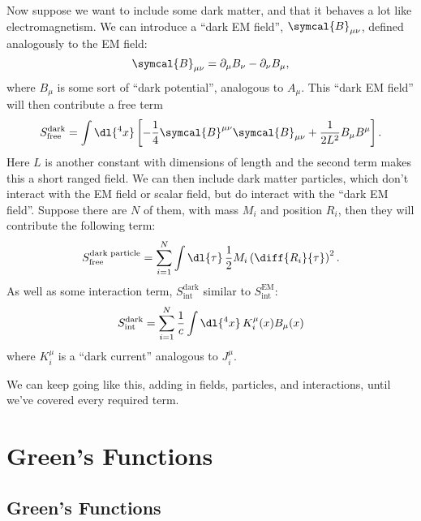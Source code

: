\documentclass[fleqn]{NotesClass}
\begin{document}
    Now suppose we want to include some dark matter, and that it behaves a lot like electromagnetism.
    We can introduce a \enquote{dark EM field}, \(\symcal{B}_{\mu\nu}\), defined analogously to the EM field:
    \begin{equation}
        \symcal{B}_{\mu\nu} = \partial_\mu B_\nu - \partial_\nu B_\mu,
    \end{equation}
    where \(B_\mu\) is some sort of \enquote{dark potential}, analogous to \(A_\mu\).
    This \enquote{dark EM field} will then contribute a free term
    \begin{equation}
        S_{\text{free}}^{\text{dark}} = \int \dl{^4x} \left[ -\frac{1}{4}\symcal{B}^{\mu\nu}\symcal{B}_{\mu\nu} + \frac{1}{2L^2} B_\mu B^\mu \right].
    \end{equation}
    Here \(L\) is another constant with dimensions of length and the second term makes this a short ranged field.
    We can then include dark matter particles, which don't interact with the EM field or scalar field, but do interact with the \enquote{dark EM field}.
    Suppose there are \(N\) of them, with mass \(M_i\) and position \(R_i\), then they will contribute the following term:
    \begin{equation}
        S_{\text{free}}^{\text{dark particle}} = \sum_{i = 1}^{N} \int \dl{\tau} \, \frac{1}{2}M_i \left( \diff{R_i}{\tau} \right)^2.
    \end{equation}
    As well as some interaction term, \(S_{\text{int}}^{\text{dark}}\) similar to \(S_{\text{int}}^{\text{EM}}\):
    \begin{equation}
        S_{\text{int}}^{\text{dark}} = \sum_{i=1}^{N} \frac{1}{c} \int \dl{^4x} \, K_i^\mu(x)B_\mu(x)
    \end{equation}
    where \(K_i^\mu\) is a \enquote{dark current} analogous to \(J_i^\mu\).
    
    We can keep going like this, adding in fields, particles, and interactions, until we've covered every required term.
    
    \part{Green's Functions}
    \chapter{Green's Functions}
\end{document}

